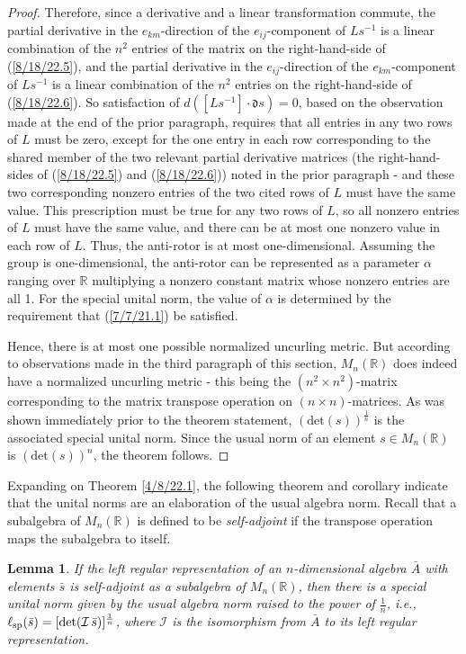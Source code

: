 \documentclass{amsart}
\numberwithin{equation}{section}
\newtheorem{lemma}[theorem]{Lemma}
\theoremstyle{definition}
\numberwithin{theorem}{section}
\begin{document}
\begin{proof}
Therefore, since a derivative and a linear transformation commute, the partial derivative in the $e_{km}$-direction of the $e_{ij}$-component of $Ls^{-1}$ is a linear combination of the $n^2$ entries of the matrix on the right-hand-side of (\ref{8/18/22.5}), and  the partial derivative in the $e_{ij}$-direction of the $e_{km}$-component of $Ls^{-1}$ is a linear combination of the $n^2$ entries on the right-hand-side of (\ref{8/18/22.6}).
So satisfaction of \mbox{$d\left([Ls^{-1}]\cdot \mathfrak{d}s\right) = 0$,} based on the observation made at the end of the prior paragraph, requires that all entries in any two rows of $L$ must be zero, except for the one entry in each row corresponding to the shared member of the two relevant partial derivative matrices (the right-hand-sides of (\ref{8/18/22.5}) and (\ref{8/18/22.6})) noted in the prior paragraph - and these two corresponding nonzero entries of the two cited rows of $L$ must have the same value.  This prescription must be true for any two rows of $L$, so all nonzero entries of $L$ must have the same value, and there can be at most one nonzero value in each row of $L$.  Thus, the anti-rotor is at most one-dimensional. Assuming the group is one-dimensional, the anti-rotor can be represented as a parameter $\alpha$ ranging over $\mathbb{R}$ multiplying a nonzero constant matrix whose nonzero entries are all 1.  
For the special unital norm, the value of $\alpha$ is determined by the requirement that (\ref{7/7/21.1}) be satisfied. 


Hence, there is at most one possible normalized uncurling metric.  But according to observations made in the third paragraph of this section, $ M_n(\mathbb{R})$ does indeed have a normalized uncurling metric - this being the $(n^2\times n^2)$-matrix corresponding to the matrix transpose operation on $(n\times n)$-matrices.  As was shown immediately prior to the theorem statement, $(\mbox{det}(s))^{\frac{1}{n}}$ is the associated special unital norm.  Since the usual norm of an element $s\in M_n(\mathbb{R})$ is $(\mbox{det}(s))^n$, the theorem follows.
 \end{proof}
 
 Expanding on Theorem \ref{4/8/22.1}, the following theorem and corollary indicate that the unital norms are an elaboration of the usual algebra norm.  Recall that a subalgebra of $M_n(\mathbb{R})$ is defined to be {\it self-adjoint} if the transpose operation maps the subalgebra to itself.
 
  \begin{lemma}\label{5/13/22.1} If the left regular representation of an $n$-dimensional algebra $\bar{A}$ with elements $\bar{s}$ is self-adjoint as a subalgebra of $M_n(\mathbb{R})$, then there is a special unital norm given by the usual algebra norm raised to the power of $\frac{1}{n}$, i.e., $\ell_{\rm sp}(\bar{s}) = [{\rm det}(\mathcal{I}\, \bar{s})]^\frac{1}{n}$, where $\mathcal{I}$ is the isomorphism from $\bar{A}$ to its left regular representation.
\end{lemma}
\end{document}
